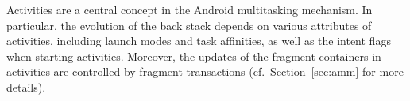 Activities are a central concept in the Android multitasking mechanism. In particular, 
the evolution of %
the back stack depends on various attributes of activities, including launch modes and task affinities, as well as the intent flags when starting activities. 
Moreover, the updates of the fragment containers in activities are controlled by fragment transactions (cf.\ Section~\ref{sec:amm} for more details).


% 
%

 

